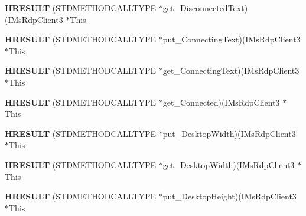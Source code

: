 \begin{DoxyCompactItemize}
\item 
\mbox{\label{struct_i_ms_rdp_client3_vtbl_a26a19d0c5dac866d2dab0d630399c2c9}} 
{\bfseries H\+R\+E\+S\+U\+LT} (S\+T\+D\+M\+E\+T\+H\+O\+D\+C\+A\+L\+L\+T\+Y\+PE $\ast$get\+\_\+\+Disconnected\+Text)(I\+Ms\+Rdp\+Client3 $\ast$This
\item 
\mbox{\label{struct_i_ms_rdp_client3_vtbl_aad5715381fe2c2c2d6c8e2dc1eb1b46f}} 
{\bfseries H\+R\+E\+S\+U\+LT} (S\+T\+D\+M\+E\+T\+H\+O\+D\+C\+A\+L\+L\+T\+Y\+PE $\ast$put\+\_\+\+Connecting\+Text)(I\+Ms\+Rdp\+Client3 $\ast$This
\item 
\mbox{\label{struct_i_ms_rdp_client3_vtbl_ae5f23abf553d35f6f20dd72a84878253}} 
{\bfseries H\+R\+E\+S\+U\+LT} (S\+T\+D\+M\+E\+T\+H\+O\+D\+C\+A\+L\+L\+T\+Y\+PE $\ast$get\+\_\+\+Connecting\+Text)(I\+Ms\+Rdp\+Client3 $\ast$This
\item 
\mbox{\label{struct_i_ms_rdp_client3_vtbl_a1c1fb6a14eec0683af898969ea3f35fe}} 
{\bfseries H\+R\+E\+S\+U\+LT} (S\+T\+D\+M\+E\+T\+H\+O\+D\+C\+A\+L\+L\+T\+Y\+PE $\ast$get\+\_\+\+Connected)(I\+Ms\+Rdp\+Client3 $\ast$This
\item 
\mbox{\label{struct_i_ms_rdp_client3_vtbl_accbb2ed5600494e068e8dac7a05f9b52}} 
{\bfseries H\+R\+E\+S\+U\+LT} (S\+T\+D\+M\+E\+T\+H\+O\+D\+C\+A\+L\+L\+T\+Y\+PE $\ast$put\+\_\+\+Desktop\+Width)(I\+Ms\+Rdp\+Client3 $\ast$This
\item 
\mbox{\label{struct_i_ms_rdp_client3_vtbl_aec4d536e3ef3360792e7282d7fa7f86a}} 
{\bfseries H\+R\+E\+S\+U\+LT} (S\+T\+D\+M\+E\+T\+H\+O\+D\+C\+A\+L\+L\+T\+Y\+PE $\ast$get\+\_\+\+Desktop\+Width)(I\+Ms\+Rdp\+Client3 $\ast$This
\item 
\mbox{\label{struct_i_ms_rdp_client3_vtbl_aaccb85df4af4d1f336b7a257ee0e95f4}} 
{\bfseries H\+R\+E\+S\+U\+LT} (S\+T\+D\+M\+E\+T\+H\+O\+D\+C\+A\+L\+L\+T\+Y\+PE $\ast$put\+\_\+\+Desktop\+Height)(I\+Ms\+Rdp\+Client3 $\ast$This
\item 
\mbox{\label{struct_i_ms_rdp_client3_vtbl_a4931e52e7fc2cc7f09e9669bb98aad31}} 

\end{DoxyCompactItemize}
